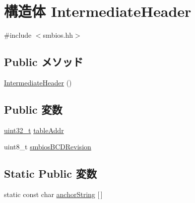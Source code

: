 \hypertarget{structX86ISA_1_1SMBios_1_1SMBiosTable_1_1SMBiosHeader_1_1IntermediateHeader}{
\section{構造体 IntermediateHeader}
\label{structX86ISA_1_1SMBios_1_1SMBiosTable_1_1SMBiosHeader_1_1IntermediateHeader}
}


{\ttfamily \#include $<$smbios.hh$>$}\subsection*{Public メソッド}
\begin{DoxyCompactItemize}
\item 
\hyperlink{structX86ISA_1_1SMBios_1_1SMBiosTable_1_1SMBiosHeader_1_1IntermediateHeader_a0a9cae5af61fe1f7bf8ba767f83765b3}{IntermediateHeader} ()
\end{DoxyCompactItemize}
\subsection*{Public 変数}
\begin{DoxyCompactItemize}
\item 
\hyperlink{Type_8hh_a435d1572bf3f880d55459d9805097f62}{uint32\_\-t} \hyperlink{structX86ISA_1_1SMBios_1_1SMBiosTable_1_1SMBiosHeader_1_1IntermediateHeader_a16ed5ed4b0f43ba258ed54dc46bf9c49}{tableAddr}
\item 
uint8\_\-t \hyperlink{structX86ISA_1_1SMBios_1_1SMBiosTable_1_1SMBiosHeader_1_1IntermediateHeader_a2be25e5d7b875ff37f92a9f1ec91fabc}{smbiosBCDRevision}
\end{DoxyCompactItemize}
\subsection*{Static Public 変数}
\begin{DoxyCompactItemize}
\item 
static const char \hyperlink{structX86ISA_1_1SMBios_1_1SMBiosTable_1_1SMBiosHeader_1_1IntermediateHeader_a67543c9b94929d07fcac35b2aedfd3f9}{anchorString} \mbox{[}$\,$\mbox{]}
\end{DoxyCompactItemize}


